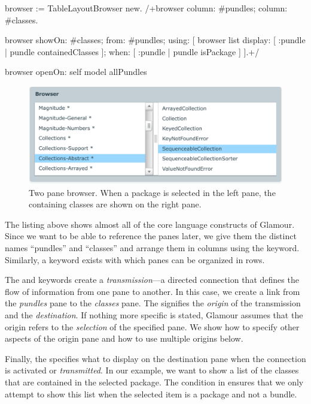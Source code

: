 \documentclass[a4paper,10pt,twoside]{book}
\begin{document}
\begin{code}{}
browser := TableLayoutBrowser new.
/+browser
	column: #pundles;
	column: #classes.

browser showOn: #classes; from: #pundles; using: [
	browser list
		display: [ :pundle | pundle containedClasses ];
		when: [ :pundle | pundle isPackage ]
].+/

browser openOn: self model allPundles
\end{code}

\begin{figure}[htbp]
\centerline{\includegraphics[width=\linewidth]{showclasses.pdf}}
\caption{Two pane browser. When a package is selected in the left pane, the containing classes are shown on the right pane.}
\label{fig:showclasses}
\end{figure}

The listing above shows almost all of the core language constructs of Glamour. Since we want to be able to reference the panes later, we give them the distinct names “pundles” and “classes” and arrange them in columns using the  keyword. Similarly, a  keyword exists with which panes can be organized in rows.

The  and  keywords create a \emph{transmission}---a directed connection that defines the flow of information from one pane to another. In this case, we create a link from the \emph{pundles} pane to the \emph{classes} pane. The  signifies the \emph{origin} of the transmission and  the \emph{destination}. If nothing more specific is stated, Glamour assumes that the origin refers to the \emph{selection} of the specified pane. We show how to specify other aspects of the origin pane and how to use multiple origins below.

Finally, the  specifies what to display on the destination pane when the connection is activated or \emph{transmitted}. In our example, we want to show a list of the classes that are contained in the selected package. The condition in  ensures that we only attempt to show this list when the selected item is a package and not a bundle.
\end{document}
